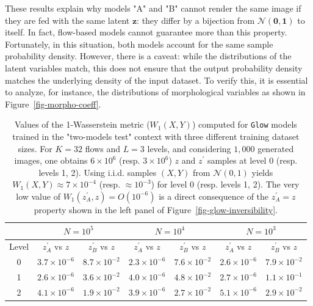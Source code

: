 \documentclass[fleqn,usenatbib]{mnras}
\begin{document}
These results explain why models "A" and "B" cannot render the same image if they are fed with the same latent $\bm{z}$: they differ by a bijection from $\mathcal{N}(\bm{0}, \bm{1})$ to itself. In fact, flow-based models cannot guarantee more than this property. Fortunately, in this situation, both models account for the same sample probability density. However, there is a caveat: while the distributions of the latent variables match, this does not ensure that the output probability density matches the underlying density of the input dataset. To verify this, it is essential to analyze, for instance, the distributions of morphological variables as shown in Figure~\ref{fig-morpho-coeff}.
\begin{table}
    \renewcommand{\arraystretch}{1.5}
    \centering
    \caption{Values of the 1-Wasserstein metric ($W_1(X,Y)$) computed for \texttt{Glow} models trained in the "two-models test" context with three different training dataset sizes. For $K=32$ flows and $L=3$ levels, and considering $1,000$ generated images, one obtains $6\times10^6$ (resp. $3\times10^6$) $z$ and $z^\prime$ samples at level 0 (resp. levels 1, 2). Using i.i.d. samples $(X,Y)$ from $\mathcal{N}(0,1)$ yields $W_1(X,Y) \approx 7\times10^{-4}$ (resp. $\approx10^{-3}$) for level 0 (resp. levels 1, 2). The very low value of $W_1(z^\prime_A, z) = O(10^{-6})$ is a direct consequence of the $z^\prime_A = z$ property shown in the left panel of Figure~\ref{fig-glow-inversibility}.}
    \begin{tabular}{|c|cc|cc|cc|}
    \hline
        \multicolumn{1}{c}{} & \multicolumn{2}{c}{$N=10^5$} & \multicolumn{2}{c}{$N=10^4$} & \multicolumn{2}{c}{$N=10^3$} \\ \hline
        \multicolumn{1}{c|}{Level} & $z^\prime_A$ vs $z$ & $z^\prime_B$ vs $z$
                                 & $z^\prime_A$ vs $z$ & $z^\prime_B$ vs $z$
                                 & $z^\prime_A$ vs $z$ & $z^\prime_B$ vs $z$ \\ \hline
        0 & $3.7\times10^{-6}$ & $8.7\times10^{-2}$  & $2.3\times10^{-6}$ & $7.6\times10^{-2}$ & $2.6\times10^{-6}$ & $7.9\times10^{-2}$  \\
        1 & $2.6\times10^{-6}$ & $3.6\times10^{-2}$  & $4.0\times10^{-6}$ & $4.8\times10^{-2}$ & $2.7\times10^{-6}$ & $1.1\times10^{-1}$  \\
        2 & $4.1\times10^{-6}$ & $1.9\times10^{-2}$  & $3.9\times10^{-6}$ & $2.7\times10^{-2}$ & $5.1\times10^{-6}$ & $2.9\times10^{-2}$  \\
        \hline
    \end{tabular}
    \label{tab:Wasserstein-1-Glow-AB}
    \renewcommand{\arraystretch}{1.}
\end{table}
\end{document}
